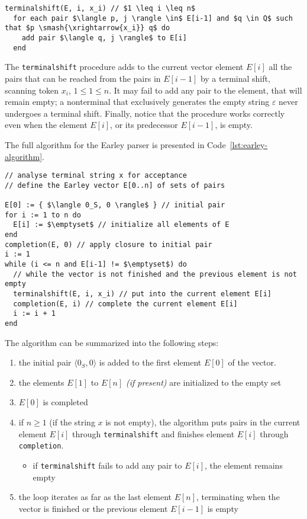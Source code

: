 \begin{lstlisting}[caption={\texttt{terminalshift} procedure}, label={lst:earley-terminalshift}]
terminalshift(E, i, x_i) // $1 \leq i \leq n$
  for each pair $\langle p, j \rangle \in$ E[i-1] and $q \in Q$ such that $p \smash{\xrightarrow{x_i}} q$ do
    add pair $\langle q, j \rangle$ to E[i]
  end
\end{lstlisting}

The \texttt{terminalshift} procedure adds to the current vector element \(E[i]\) all the pairs that can be reached from the pairs in \(E[i-1]\) by a terminal shift, scanning token \(x_i\), \(1 \leq 1 \leq n\).
It may fail to add any pair to the element, that will remain empty;
a nonterminal that exclusively generates the empty string \(\varepsilon\) never undergoes a terminal shift.
Finally, notice that the procedure works correctly even when the element \(E[i]\), or its predecessor \(E[i-1]\), is empty.

The full algorithm for the Earley parser is presented in Code~\ref{lst:earley-algorithm}.

\begin{lstlisting}[caption={Earley's Algorithm}, label={lst:earley-algorithm}]
// analyse terminal string x for acceptance
// define the Earley vector E[0..n] of sets of pairs

E[0] := { $\langle 0_S, 0 \rangle$ } // initial pair
for i := 1 to n do
  E[i] := $\emptyset$ // initialize all elements of E
end
completion(E, 0) // apply closure to initial pair
i := 1
while (i <= n and E[i-1] != $\emptyset$) do
  // while the vector is not finished and the previous element is not empty
  terminalshift(E, i, x_i) // put into the current element E[i]
  completion(E, i) // complete the current element E[i]
  i := i + 1
end
\end{lstlisting}

The algorithm can be summarized into the following steps:
\begin{enumerate}
  \item the initial pair \(\langle 0_S, 0 \rangle\) is added to the first element \(E[0]\) of the vector.
  \item the elements \(E[1]\) to \(E[n]\) \textit{(if present)} are initialized to the empty set
  \item \(E[0]\) is completed
  \item if \(n \geq 1\) (if the string \(x\) is not empty), the algorithm puts pairs in the current element \(E[i]\) through \texttt{terminalshift} and finishes element \(E[i]\) through \texttt{completion}.
        \begin{itemize}
          \item if \texttt{terminalshift} fails to add any pair to \(E[i]\), the element remains empty
        \end{itemize}
  \item the loop iterates as far as the last element \(E[n]\), terminating when the vector is finished or the previous element \(E[i-1]\) is empty
\end{enumerate}

